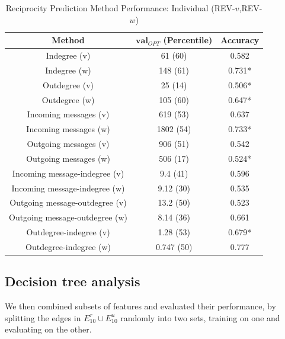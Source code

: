\documentclass[conference]{IEEEtran}
\begin{document}
\begin{table}[!t]
\renewcommand{\arraystretch}{1.3}
\caption{Reciprocity Prediction Method Performance: Individual (REV-$v$,REV-$w$)}
\label{table_recresults_indivVW}
\centering
\begin{tabular}{|c||c|c|}
\hline
\bf{Method} & $\mathbf{val}_{OPT}$ (Percentile) & \bf{Accuracy} \\
\hline
Indegree (v) &  61 (60) & 0.582 \\
Indegree (w) & 148 (61) & 0.731* \\
Outdegree (v) & 25 (14) & 0.506* \\
Outdegree (w) & 105 (60) & 0.647* \\
\hline
Incoming messages (v) & 619 (53) & 0.637 \\
Incoming messages (w) & 1802 (54) & 0.733* \\
Outgoing messages (v) & 906 (51) & 0.542 \\
Outgoing messages (w) & 506 (17) & 0.524* \\
\hline
Incoming message-indegree (v) & 9.4 (41) & 0.596 \\
Incoming message-indegree (w) & 9.12 (30) & 0.535 \\
Outgoing message-outdegree (v) & 13.2 (50) & 0.523 \\
Outgoing message-outdegree (w) & 8.14 (36) & 0.661 \\
\hline
Outdegree-indegree (v) & 1.28 (53) & 0.679* \\
Outdegree-indegree (w) & 0.747 (50) & 0.777 \\
\hline
\end{tabular}
\end{table}

\subsection{Decision tree analysis}

We then combined subsets of features and evaluated their performance, by splitting the edges in $E^r_10 \cup E_10^u$ randomly into two sets, training on one and evaluating on the other.
\end{document}
